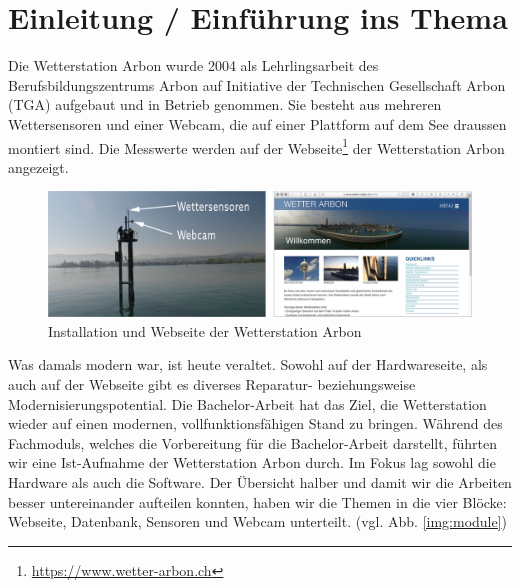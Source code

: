 \section*{Einleitung / Einführung ins Thema}

\newline
{}\newline
{}\newline

Die Wetterstation Arbon wurde 2004 als Lehrlingsarbeit des Berufsbildungszentrums Arbon auf Initiative der Technischen Gesellschaft Arbon (TGA) aufgebaut und in Betrieb genommen. Sie besteht aus mehreren Wettersensoren und einer Webcam, die auf einer Plattform auf dem See draussen montiert sind. Die Messwerte werden auf der Webseite\footnote{ \url{https://www.wetter-arbon.ch}}  der Wetterstation Arbon angezeigt.

\begin{figure}[h!]
	\centering
	\includegraphics[width=1\linewidth]{img/kombi}
	\caption{Installation und Webseite der Wetterstation Arbon}
	\label{img:wetterstation}
\end{figure}

Was damals modern war, ist heute veraltet. Sowohl auf der Hardwareseite, als auch auf der Webseite gibt es diverses Reparatur- beziehungsweise Modernisierungspotential. Die Bachelor-Arbeit hat das Ziel, die Wetterstation wieder auf einen modernen, vollfunktionsfähigen Stand zu bringen. Während des Fachmoduls, welches die Vorbereitung für die Bachelor-Arbeit darstellt, führten wir eine Ist-Aufnahme der Wetterstation Arbon durch. Im Fokus lag sowohl die Hardware als auch die Software. Der Übersicht halber und damit wir die Arbeiten besser untereinander aufteilen konnten, haben wir die Themen in die vier Blöcke:  Webseite, Datenbank, Sensoren und Webcam unterteilt. (vgl. Abb. \ref{img:module})


